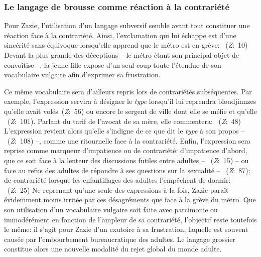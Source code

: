 \subsubsection{Le langage de brousse comme réaction à la contrariété}
Pour Zazie, l'utilisation d'un langage subversif semble avant tout constituer une réaction face à la contrariété.
Ainsi, l'exclamation qui lui échappe est d'une sincérité sans équivoque lorsqu'elle apprend que le métro est en grève: ~(\textit{Z}:~10)
Devant la plus grande des déceptions -- le métro étant son principal objet de convoitise --, la jeune fille expose d'un seul coup toute l'étendue de son vocabulaire vulgaire afin d'exprimer sa frustration.
\par
Ce même vocabulaire sera d'ailleurs repris lors de contrariétés subséquentes.
Par exemple, l'expression  servira à désigner le \textit{type} lorsqu'il lui reprendra  bloudjinnzes qu'elle avait volés~(\textit{Z}:~56) ou encore le sergent de ville dont elle se méfie et qu'elle ~(\textit{Z}:~101).
Parlant du tarif de l'avocat de sa mère, elle commentera: ~(\textit{Z}:~48)
L'expression revient alors qu'elle s'indigne de ce que dit le \textit{type} à son propos -- ~(\textit{Z}:~108) --, comme une ritournelle face à la contrariété.
Enfin, l'expression  sera reprise comme marqueur d'impatience ou de contrariété: d'impatience d'abord, que ce soit face à la lenteur des discussions futiles entre adultes -- ~(\textit{Z}:~15) -- ou face au refus des adultes de répondre à ses questions sur la sexualité -- ~(\textit{Z}:~87); de contrariété lorsque les enfantillages des adultes l'empêchent de dormir: ~(\textit{Z}:~25)
Ne reprenant qu'une seule des expressions à la fois, Zazie paraît évidemment moins irritée par ces désagréments que face à la grève du métro.
Que son utilisation d'un vocabulaire vulgaire soit faite avec parcimonie ou immodérément en fonction de l'ampleur de sa contrariété, l'objectif reste toutefois le même: il s'agit pour Zazie d'un exutoire à sa frustration, laquelle est souvent causée par l'embourbement bureaucratique des adultes.
Le langage grossier constitue alors une nouvelle modalité du rejet global du monde adulte.
\par
